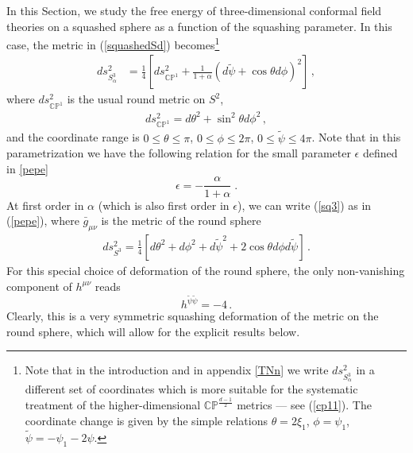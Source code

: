 \documentclass[12pt]{article}
\numberwithin{equation}{section}
\newcommand{\req}[1]{(\ref{#1})} %
\begin{document}
In this Section, we study the free energy of three-dimensional conformal field theories on a squashed sphere as a function of the squashing parameter. 
In this case, the metric in \req{squashedSd} becomes\footnote{Note that in the introduction and in appendix \ref{TNn} we write $ds_{S^{3}_{\alpha}}^2$ in a different set of coordinates which is more suitable for the systematic treatment of the higher-dimensional $\mathbb{CP}^{\frac{d-1}{2}}$ metrics --- see \req{cp11}. The coordinate change is given by the simple relations $\theta=2\xi_1$, $\phi=\psi_1$, $\tilde{\psi}= -\psi_1-2\psi $.} 
%
\begin{align}\label{sq3}
ds_{S^{3}_{\alpha}}^2& =\frac{1}{4}\left[ ds^2_{\mathbb{CP}^{1}}+\frac{1}{1+\alpha}(d\tilde{\psi}+\cos \theta d\phi)^2\right]\, , 
\end{align}
%
where $ds^2_{\mathbb{CP}^1}$ is the usual round metric on $S^2$,
%
\begin{align}\label{sq43}
ds^2_{\mathbb{CP}^{1}}=d\theta^2+\sin^2\theta d\phi^2\, ,
\end{align}
%
and the coordinate range is $0\leq \theta\leq \pi$, $0\leq\phi\leq 2\pi$, $0\leq \tilde{\psi} \leq 4\pi$. Note that in this parametrization we have the following relation for the small parameter $\epsilon$ defined in \eqref{pepe} 
%
\begin{equation}
\epsilon = - \frac{\alpha}{1+\alpha}\;.
\end{equation}
%
At first order in $\alpha$ (which is also first order in $\epsilon$), we can write \req{sq3} as in \req{pepe}, where $\bar{g}_{\mu\nu}$ is the metric of the round sphere
%
\begin{align}\label{TN1n222}
ds^2 _{S^3}=\frac{1}{4}\left[d\theta^2+d\phi^2+d\tilde{\psi}^2+2\cos\theta d\phi d\tilde{\psi} \right]\,.
\end{align}
%
For this special choice of deformation of the round sphere, the only non-vanishing component of $h^{\mu\nu}$ reads
%
\begin{equation}\label{hpsipsi}
h^{\tilde{\psi}\tilde{\psi}}=-4\, .
\end{equation}
%
Clearly, this is a very symmetric squashing deformation of the metric on the round sphere, which will allow for the explicit results below.
\end{document}
